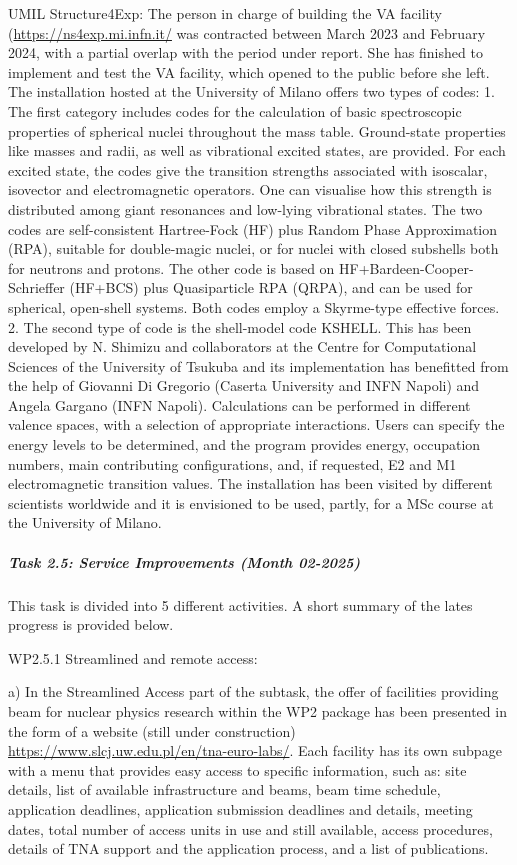 UMIL Structure4Exp: The person in charge of building the VA facility (\url{https://ns4exp.mi.infn.it/} was contracted between March 2023 and February 2024, with a partial overlap with the period under report. She has finished to implement and test the VA facility, which opened to the public before she left.  The installation hosted at the University of Milano offers two types of codes:
1. The first category includes codes for the calculation of basic spectroscopic properties of spherical nuclei throughout the mass table. Ground-state properties like masses and radii, as well as vibrational excited states, are provided. For each excited state, the codes give the transition strengths associated with isoscalar, isovector and electromagnetic operators. One can visualise how this strength is distributed among giant resonances and low-lying vibrational states. The two codes are self-consistent Hartree-Fock (HF) plus Random Phase Approximation (RPA), suitable for double-magic nuclei, or for nuclei with closed subshells both for neutrons and protons. The other code is based on HF+Bardeen-Cooper-Schrieffer (HF+BCS) plus Quasiparticle RPA (QRPA), and can be used for spherical, open-shell systems. Both codes employ a Skyrme-type effective forces.
2. The second type of code is the shell-model code KSHELL. This has been developed by N. Shimizu and collaborators at the Centre for Computational Sciences of the University of Tsukuba and its implementation has benefitted from the help of Giovanni Di Gregorio (Caserta University and INFN Napoli) and Angela Gargano (INFN Napoli). Calculations can be performed in different valence spaces, with a selection of appropriate interactions. Users can specify the energy levels to be determined, and the program provides energy, occupation numbers, main contributing configurations, and, if requested, E2 and M1 electromagnetic transition values. 
The installation has been visited by different scientists worldwide and it is envisioned to be used, partly, for a MSc course at the University of Milano.


\subparagraph{Task 2.5: Service Improvements (Month 02-2025)} \mbox{}


This task is divided into 5 different activities. A short summary of the lates progress is provided below.

WP2.5.1 Streamlined and remote access: 

a) In the Streamlined Access part of the subtask, the offer of facilities providing beam for nuclear physics research within the WP2 package has been presented in the form of a website (still under construction) \url{https://www.slcj.uw.edu.pl/en/tna-euro-labs/}. Each facility has its own subpage with a menu that provides easy access to specific information, such as: site details, list of available infrastructure and beams, beam time schedule, application deadlines, application submission deadlines and details, meeting dates, total number of access units in use and still available, access procedures, details of TNA support and the application process, and a list of publications. 

